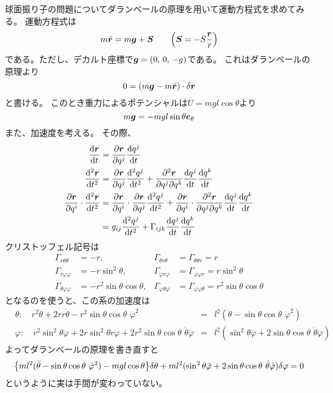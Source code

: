 \documentclass[../../master.tex]{subfiles}
\begin{document}
球面振り子の問題についてダランベールの原理を用いて運動方程式を求めてみる。
運動方程式は
\begin{equation*}
    m\ddot{\vb*{r}} = m\vb*{g} + \vb*{S}\qquad\qty(\vb*{S}=-S\frac{\vb*{r}}{r})
\end{equation*}
である。ただし、デカルト座標で\(\vb*{g}=(0,\,0,\,-g)\)である。
これはダランベールの原理より
\begin{equation*}
    0=(m\vb*{g}-m\ddot{\vb*{r}})\cdot \delta\vb*{r}
\end{equation*}
と書ける。
このとき重力によるポテンシャルは\(U = mgl\cos\theta\)より
\begin{equation*}
    m\vb*{g} = -mgl\sin\theta \vb*{e}_\theta
\end{equation*}
また、加速度を考える。
その際、
\begin{align*}
    \dv{\vb*{r}}{t} &= \pdv{\vb*{r}}{q^j}\dv{q^j}{t}\\
    \dv[2]{\vb*{r}}{t} &= \pdv{\vb*{r}}{q^j}\dv[2]{q^j}{t} + \pdv[2]{\vb*{r}}{q^j}{q^k}\dv{q^j}{t}\dv{q^k}{t}\\
    \pdv{\vb*{r}}{q^i}\cdot\dv[2]{\vb*{r}}{t} &= \pdv{\vb*{r}}{q^i}\cdot\pdv{\vb*{r}}{q^j}\dv[2]{q^j}{t} + \pdv{\vb*{r}}{q^i}\cdot\pdv[2]{\vb*{r}}{q^j}{q^k}\dv{q^j}{t}\dv{q^k}{t}\\
    &= g_{ij}\dv[2]{q^j}{t} + \Gamma_{ijk}\dv{q^j}{t}\dv{q^k}{t}
\end{align*}
クリストッフェル記号は
\begin{align*}
    \Gamma_{r\theta\theta} &= - r, &
    \Gamma_{\theta r\theta} &= \Gamma_{\theta \theta r} = r\\
    \Gamma_{r\varphi\varphi} &= - r\sin^2\theta, &
    \Gamma_{\varphi r\varphi} &= \Gamma_{\varphi\varphi r} = r\sin^2\theta\\
    \Gamma_{\theta\varphi\varphi} &= -r^2\sin\theta\cos\theta, &
    \Gamma_{\varphi\theta\varphi} &= \Gamma_{\varphi\varphi\theta} =  r^2\sin\theta\cos\theta
\end{align*}
となるのを使うと、この系の加速度は
\begin{align*}
    &\theta:\quad r^2\ddot{\theta} + 2r\dot{r}\dot{\theta} -r^2\sin\theta\cos\theta\,\,\dot{\varphi}^2
    &=& l^2(\ddot{\theta}-\sin\theta\cos\theta\,\,\dot{\varphi}^2)\\
    &\varphi:\quad r^2\sin^2\theta\ddot{\varphi} + 2r\sin^2\theta \dot{r}\dot{\varphi} +2r^2\sin\theta\cos\theta \,\,\dot{\theta}\dot{\varphi}
    &=&  l^2(\sin^2\theta\ddot{\varphi} +2\sin\theta\cos\theta \,\,\dot{\theta}\dot{\varphi})
\end{align*}
よってダランベールの原理を書き直すと
\begin{equation*}
    \qty{ml^2(\ddot{\theta}-\sin\theta\cos\theta\,\,\dot{\varphi}^2) - mgl\cos\theta}\delta\theta
    + ml^2(\sin^2\theta\ddot{\varphi} +2\sin\theta\cos\theta \,\,\dot{\theta}\dot{\varphi})\delta\varphi
    =0
\end{equation*}
というように実は手間が変わっていない。
\end{document}
